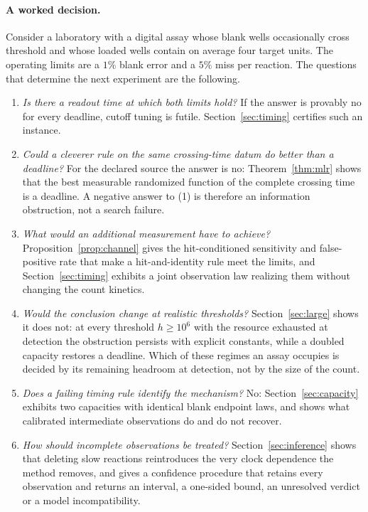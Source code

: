 \documentclass[11pt,a4paper]{article}
\theoremstyle{plain}
\theoremstyle{definition}
\theoremstyle{remark}
\begin{document}
\paragraph{A worked decision.}
Consider a laboratory with a digital assay whose blank wells occasionally cross threshold and whose loaded wells contain on average four target units. The operating limits are a $1\%$ blank error and a $5\%$ miss per reaction. The questions that determine the next experiment are the following.
\begin{enumerate}[label=(\arabic*)]
\item \emph{Is there a readout time at which both limits hold?} If the answer is provably no for every deadline, cutoff tuning is futile. Section~\ref{sec:timing} certifies such an instance.
\item \emph{Could a cleverer rule on the same crossing-time datum do better than a deadline?} For the declared source the answer is no: Theorem~\ref{thm:mlr} shows that the best measurable randomized function of the complete crossing time is a deadline. A negative answer to (1) is therefore an information obstruction, not a search failure.
\item \emph{What would an additional measurement have to achieve?} Proposition~\ref{prop:channel} gives the hit-conditioned sensitivity and false-positive rate that make a hit-and-identity rule meet the limits, and Section~\ref{sec:timing} exhibits a joint observation law realizing them without changing the count kinetics.
\item \emph{Would the conclusion change at realistic thresholds?} Section~\ref{sec:large} shows it does not: at every threshold $h\ge10^{6}$ with the resource exhausted at detection the obstruction persists with explicit constants, while a doubled capacity restores a deadline. Which of these regimes an assay occupies is decided by its remaining headroom at detection, not by the size of the count.
\item \emph{Does a failing timing rule identify the mechanism?} No: Section~\ref{sec:capacity} exhibits two capacities with identical blank endpoint laws, and shows what calibrated intermediate observations do and do not recover.
\item \emph{How should incomplete observations be treated?} Section~\ref{sec:inference} shows that deleting slow reactions reintroduces the very clock dependence the method removes, and gives a confidence procedure that retains every observation and returns an interval, a one-sided bound, an unresolved verdict or a model incompatibility.
\end{enumerate}
\end{document}
